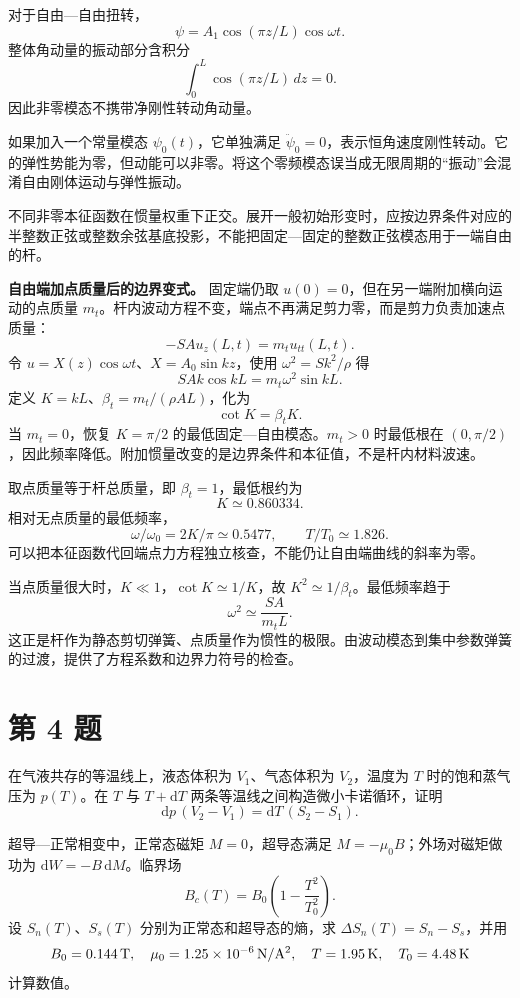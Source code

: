 \documentclass[12pt,a4paper,UTF8]{ctexart}
\begin{document}
对于自由---自由扭转， \[
\psi=A_1\cos(\pi z/L)\cos\omega t.
\] 整体角动量的振动部分含积分 \[
\int_0^L\cos(\pi z/L)\,dz=0.
\] 因此非零模态不携带净刚性转动角动量。

如果加入一个常量模态 \(\psi_0(t)\)，它单独满足
\(\ddot\psi_0=0\)，表示恒角速度刚性转动。它的弹性势能为零，但动能可以非零。将这个零频模态误当成无限周期的``振动''会混淆自由刚体运动与弹性振动。

不同非零本征函数在惯量权重下正交。展开一般初始形变时，应按边界条件对应的半整数正弦或整数余弦基底投影，不能把固定---固定的整数正弦模态用于一端自由的杆。

\textbf{自由端加点质量后的边界变式。} 固定端仍取
\(u(0)=0\)，但在另一端附加横向运动的点质量
\(m_t\)。杆内波动方程不变，端点不再满足剪力零，而是剪力负责加速点质量：
\[
-SA u_z(L,t)=m_tu_{tt}(L,t).
\] 令 \(u=X(z)\cos\omega t\)、\(X=A_0\sin kz\)，使用
\(\omega^2=Sk^2/\rho\) 得 \[
SAk\cos kL=m_t\omega^2\sin kL.
\] 定义 \(K=kL\)、\(\beta_t=m_t/(\rho AL)\)，化为 \[
\cot K=\beta_tK.
\] 当 \(m_t=0\)，恢复 \(K=\pi/2\) 的最低固定---自由模态。\(m_t>0\)
时最低根在
\((0,\pi/2)\)，因此频率降低。附加惯量改变的是边界条件和本征值，不是杆内材料波速。

取点质量等于杆总质量，即 \(\beta_t=1\)，最低根约为 \[
K\simeq0.860334.
\] 相对无点质量的最低频率， \[
\omega/\omega_0=2K/\pi\simeq0.5477,
\qquad T/T_0\simeq1.826.
\] 可以把本征函数代回端点力方程独立核查，不能仍让自由端曲线的斜率为零。

当点质量很大时，\(K\ll1\)，\(\cot K\simeq1/K\)，故
\(K^2\simeq1/\beta_t\)。最低频率趋于 \[
\omega^2\simeq\frac{SA}{m_tL}.
\]
这正是杆作为静态剪切弹簧、点质量作为惯性的极限。由波动模态到集中参数弹簧的过渡，提供了方程系数和边界力符号的检查。

\newpage

\section{第 4 题}\label{ux7b2c-4-ux9898}

在气液共存的等温线上，液态体积为 \(V_1\)、气态体积为 \(V_2\)，温度为
\(T\) 时的饱和蒸气压为 \(p(T)\)。在 \(T\) 与 \(T+\mathrm dT\)
两条等温线之间构造微小卡诺循环，证明 \[
\mathrm dp\,(V_2-V_1)=\mathrm dT\,(S_2-S_1).
\]

超导---正常相变中，正常态磁矩 \(M=0\)，超导态满足
\(M=-\mu_0B\)；外场对磁矩做功为 \(\mathrm dW=-B\,\mathrm dM\)。临界场 \[
B_c(T)=B_0\left(1-\frac{T^2}{T_0^2}\right).
\] 设 \(S_n(T)\)、\(S_s(T)\) 分别为正常态和超导态的熵，求
\(\Delta S_n(T)=S_n-S_s\)，并用 \[
B_0=0.144{\rm\,T},\quad
\mu_0=1.25\times10^{-6}{\rm\,N/A^2},\quad
T=1.95{\rm\,K},\quad T_0=4.48{\rm\,K}
\] 计算数值。
\end{document}
